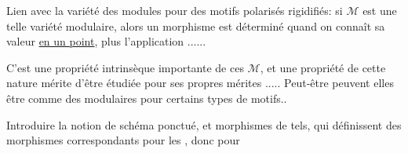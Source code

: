 Lien avec la variété des modules pour des motifs polarisés rigidifiés:
si  $\mathcal M$ est une telle variété modulaire, alors un morphisme
est déterminé quand on connaît sa valeur \uline{en un point}, plus l'application
......

C'est une propriété intrinsèque importante de ces $\mathcal M$, et une propriété de cette nature mérite d'être étudiée pour ses propres mérites .....
Peut-être peuvent elles  être
comme des  modulaires pour certains types de motifs..


Introduire la notion de schéma  ponctué,
et morphismes de tels, qui définissent des morphismes correspondants pour les
,
donc pour

